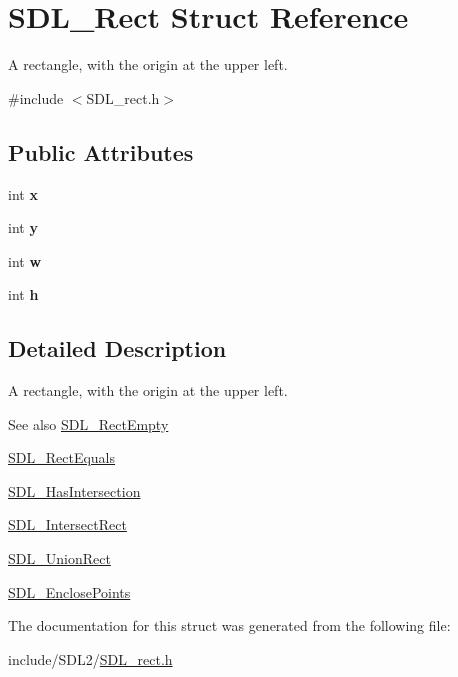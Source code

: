 \hypertarget{struct_s_d_l___rect}{}\section{S\+D\+L\+\_\+\+Rect Struct Reference}
\label{struct_s_d_l___rect}


A rectangle, with the origin at the upper left.  




{\ttfamily \#include $<$S\+D\+L\+\_\+rect.\+h$>$}

\subsection*{Public Attributes}
\begin{DoxyCompactItemize}
\item 
\mbox{\label{struct_s_d_l___rect_a85418d94621dd6855805c4b5c7bf6482}} 
int {\bfseries x}
\item 
\mbox{\label{struct_s_d_l___rect_a822694af8ddca5fd0d5d94e47106ab85}} 
int {\bfseries y}
\item 
\mbox{\label{struct_s_d_l___rect_a56b7be5738fb6fab86881534a814c45e}} 
int {\bfseries w}
\item 
\mbox{\label{struct_s_d_l___rect_a0a17d46b320af8063b746153348edd72}} 
int {\bfseries h}
\end{DoxyCompactItemize}


\subsection{Detailed Description}
A rectangle, with the origin at the upper left. 

\begin{DoxySeeAlso}{See also}
\hyperlink{_s_d_l__rect_8h_aac0e9b5d3f34baec6a2cde95bb01f49c}{S\+D\+L\+\_\+\+Rect\+Empty} 

\hyperlink{_s_d_l__rect_8h_a156979fd3561cf90b87741d11057262a}{S\+D\+L\+\_\+\+Rect\+Equals} 

\hyperlink{_s_d_l__rect_8h_a191ec0b069421d4a36304b475697e847}{S\+D\+L\+\_\+\+Has\+Intersection} 

\hyperlink{_s_d_l__rect_8h_aff8e3dd3b1a25443cd7c8cf02a087290}{S\+D\+L\+\_\+\+Intersect\+Rect} 

\hyperlink{_s_d_l__rect_8h_a659f2c25335202888408c95195823f9c}{S\+D\+L\+\_\+\+Union\+Rect} 

\hyperlink{_s_d_l__rect_8h_afcbb58dbba760b9e6fdb4b5d1ece015c}{S\+D\+L\+\_\+\+Enclose\+Points} 
\end{DoxySeeAlso}


The documentation for this struct was generated from the following file\+:\begin{DoxyCompactItemize}
\item 
include/\+S\+D\+L2/\hyperlink{_s_d_l__rect_8h}{S\+D\+L\+\_\+rect.\+h}\end{DoxyCompactItemize}
